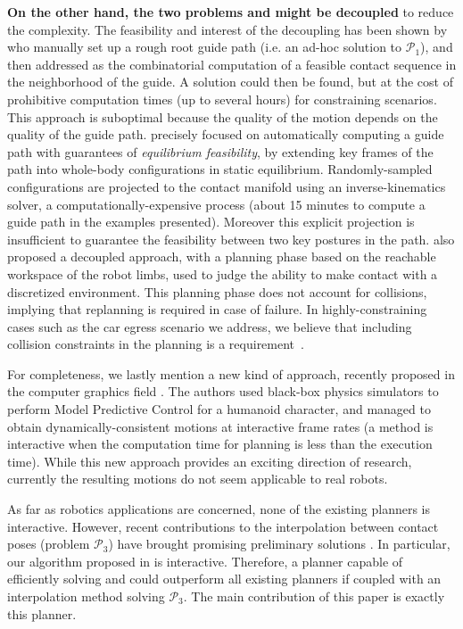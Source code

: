 \textbf{On the other hand, the two problems \Pa and \Pb might be decoupled} to reduce the complexity. The feasibility and interest of the decoupling has been shown by \citeauthor{DBLP:conf/iser/EscandeKMG08} who manually set up a rough root guide path (i.e. an ad-hoc solution to $\mathcal{P}_1$), and then addressed \Pb as the combinatorial computation of a feasible contact sequence in the neighborhood of the guide. A solution could then be found, %
but at the cost of prohibitive computation times (up to several hours) for constraining scenarios. This approach is suboptimal because the quality of the motion depends on the quality of the guide path. \citeauthor{Bouyarmane2009} precisely focused on automatically computing a guide path with guarantees of \textit{equilibrium feasibility}, by extending key frames of the path into whole-body configurations in static equilibrium. Randomly-sampled configurations are projected to the contact manifold using an inverse-kinematics solver, a computationally-expensive process (about 15 minutes to compute a guide path in the examples presented). Moreover this explicit projection is insufficient to guarantee the feasibility between two key postures in the path. \citeauthor{7140082} also proposed a decoupled approach, with a planning phase based on the reachable workspace of the robot limbs, used to judge the ability to make contact with a discretized environment. This planning phase does not account for collisions, implying that replanning is required in case of failure. In highly-constraining cases such as the car egress scenario we address, we believe that including collision constraints in the planning is a requirement~\citep{tonneauisrr15,grey2017footstep}.

For completeness, we lastly mention a new kind of approach, recently proposed in the computer graphics field \citep{hamalainen_cpbp_2015}. The authors
used black-box physics simulators to perform Model Predictive Control for a humanoid character, and managed to obtain dynamically-consistent motions
at \gls{interactive} frame rates (a method is interactive when the computation time for planning is less than the
execution time). While this new approach provides an exciting direction of research, currently the resulting motions
 do not seem applicable to real robots.

As far as robotics applications are concerned, none of the existing planners is \gls{interactive}.
However, recent contributions to the interpolation between contact poses (problem $\mathcal{P}_3$) have brought promising preliminary solutions \citep{Hauser2014, herzog2015trajectory, Park116, Carpentier2016}. In particular, our algorithm proposed in \citeauthor{Carpentier2016} is \gls{interactive}.
Therefore, a planner capable of efficiently solving \Pa and \Pb could outperform all existing planners if coupled with an interpolation method solving $\mathcal{P}_3$.
The main contribution of this paper is exactly this planner.


